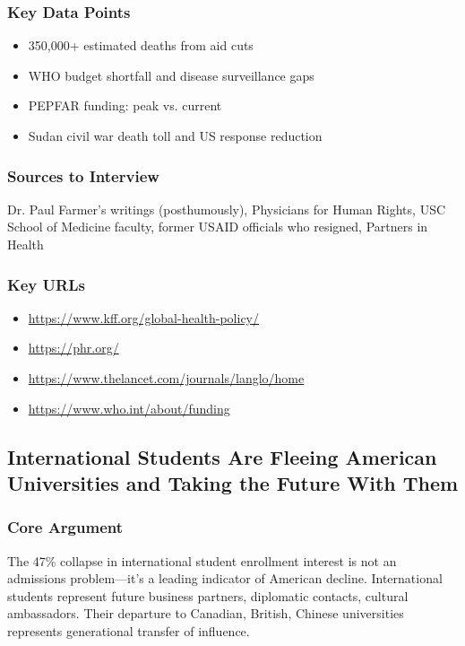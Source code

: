 \documentclass[11pt,letterpaper]{article}
\begin{document}
\subsubsection*{Key Data Points}
\begin{itemize}[noitemsep]
    \item 350,000+ estimated deaths from aid cuts
    \item WHO budget shortfall and disease surveillance gaps
    \item PEPFAR funding: peak vs. current
    \item Sudan civil war death toll and US response reduction
\end{itemize}

\subsubsection*{Sources to Interview}
Dr. Paul Farmer's writings (posthumously), Physicians for Human Rights, USC School of Medicine faculty, former USAID officials who resigned, Partners in Health

\subsubsection*{Key URLs}
\begin{itemize}[noitemsep]
    \item \url{https://www.kff.org/global-health-policy/}
    \item \url{https://phr.org/}
    \item \url{https://www.thelancet.com/journals/langlo/home}
    \item \url{https://www.who.int/about/funding}
\end{itemize}

\newpage
\subsection{International Students Are Fleeing American Universities and Taking the Future With Them}

\subsubsection*{Core Argument}
The 47\% collapse in international student enrollment interest is not an admissions problem---it's a leading indicator of American decline. International students represent future business partners, diplomatic contacts, cultural ambassadors. Their departure to Canadian, British, Chinese universities represents generational transfer of influence.
\end{document}
